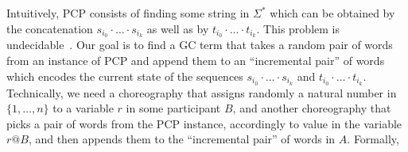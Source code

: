 \NI Intuitively, PCP consists of finding some string in $\Sigma^*$
which can be obtained by the concatenation $s_{i_0}\cdot \ldots \cdot
s_{i_k}$ as well as by $t_{i_0}\cdot \ldots \cdot t_{i_k}$. This
problem is undecidable~\cite{Post:pcp}.
%
Our goal is to find a GC term that takes a random pair of words from
an instance of PCP and append them to an ``incremental pair'' of words
which encodes the current state of the sequences $s_{i_0}\cdot \ldots
\cdot s_{i_k}$ and $t_{i_0}\cdot \ldots \cdot t_{i_k}$.  Technically,
we need a choreography that assigns randomly a natural number in $\{1,
\dots, n\}$ to a variable $r$ in some participant $B$, and another
choreography that picks a pair of words from the PCP instance,
accordingly to value in the variable $r@B$, and then appends them to
the ``incremental pair'' of words in $A$.
Formally, %
